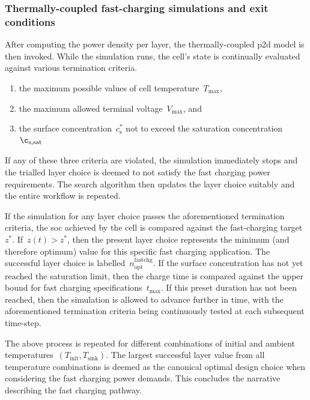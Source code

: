 \subsubsection*{Thermally-coupled fast-charging simulations and exit conditions}

After computing  the power  density per  layer, the  thermally-coupled \gls{p2d}
model  is  then  invoked.  While  the  simulation  runs,  the  cell's  state  is
continually evaluated against various termination criteria.
\begin{enumerate}
    \item the maximum possible values of cell temperature~$T_\text{max}$,
    \item the maximum allowed terminal voltage~$V_\text{max}$, and
    \item the surface concentration~$c_\text{s}^{\ast}$ not to exceed the saturation concentration~$\c_\text{s,sat}$
\end{enumerate}

If any  of these three criteria  are violated, the simulation  immediately stops
and the trialled layer  choice is deemed to not satisfy  the fast charging power
requirements. The  search algorithm then  updates the layer choice  suitably and
the entire workflow is repeated.

If the  simulation for  any layer choice  passes the  aforementioned termination
criteria,  the  \gls{soc}   achieved  by  the  cell  is   compared  against  the
fast-charging   target~$z^\ast$.  If~${z(t)   >  z^\ast}$,   then  the   present
layer  choice  represents   the  minimum  (and  therefore   optimum)  value  for
this  specific  fast  charging  application.  The  successful  layer  choice  is
labelled~$n_\text{opt}^\text{fastchg}$. If the surface concentration has not yet
reached the saturation limit, then the charge time is compared against the upper
bound for  fast charging specifications~$t_\text{max}$. If  this preset duration
has not been reached, then the simulation is allowed to advance further in time,
with the aforementioned  termination criteria being continuously  tested at each
subsequent time-step.

The above process is repeated for  different combinations of initial and ambient
temperatures~${(T_\text{init},  T_\text{sink})}$.  The  largest  successful
layer value from all temperature combinations is deemed as the canonical optimal
design choice when  considering the fast charging power  demands. This concludes
the  narrative describing  the  fast charging  pathway.

